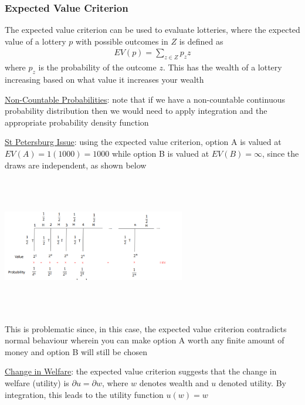 \documentclass{article}
\begin{document}
\subsubsection{Expected Value Criterion}
The expected value criterion can be used to evaluate lotteries, where the expected value of a lottery $p$ with possible outcomes in $Z$ is defined as
\begin{gather*}
  EV(p) = \sum_{z \in Z} p_{z}z
\end{gather*}
where $p_{z}$ is the probability of the outcome $z$. This has the wealth of a lottery increasing based on what value it increases your wealth
\par \vspace{0.3em}
  \underline{Non-Countable Probabilities}: note that if we have a non-countable continuous probability distribution then we would need to apply integration and the appropriate probability density function
  \par
  \underline{St Petersburg Issue}: using the expected value criterion, option A is valued at $EV(A) = 1(1000) = 1000$ while option B is valued at $EV(B) = \infty$, since the draws are independent, as shown below
  \\
  \begin{center}
    \includegraphics[width=8cm, height=6cm]{pic27}
  \end{center}
  This is problematic since, in this case, the expected value criterion contradicts normal behaviour wherein you can make option A worth any finite amount of money and option B will still be chosen
  \par
  \underline{Change in Welfare}: the expected value criterion suggests that the change in welfare (utility) is $\partial u = \partial w$, where $w$ denotes wealth and $u$ denoted utility. By integration, this leads to the utility function $u(w) = w$
\vspace{6mm}
\end{document}
